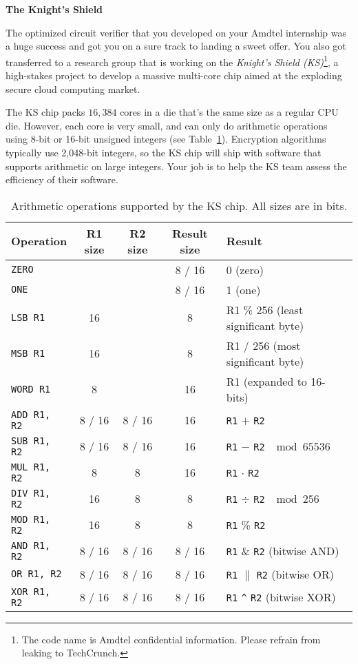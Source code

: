 \documentclass[12pt,twoside]{article}
\begin{document}
\begin{problems}

\problem {} \textbf{The Knight's Shield}

The optimized circuit verifier that you developed on your Amdtel internship was
a huge success and got you on a sure track to landing a sweet offer. You also
got transferred to a research group that is working on the \textit{Knight's
Shield (KS)}\footnote{The code name is Amdtel confidential information. Please
refrain from leaking to TechCrunch.}, a high-stakes project to develop a massive
multi-core chip aimed at the exploding secure cloud computing market.

The KS chip packs $16{,}384$ cores in a die that's the same size as a regular
CPU die. However, each core is very small, and can only do arithmetic operations
using 8-bit or 16-bit unsigned integers (see Table~\ref{table:ks-opcodes}).
Encryption algorithms typically use 2,048-bit integers, so the KS chip will ship
with software that supports arithmetic on large integers. Your job is to help
the KS team assess the efficiency of their software.

\begin{table}[htbp]
\centering
\begin{tabular}{|l|c|c|c|l|}
\hline
Operation & R1 size & R2 size & Result size & Result \\
\hline
\texttt{ZERO} & & & 8 / 16 & 0 (zero) \\ 
\hline
\texttt{ONE} & & & 8 / 16 & 1 (one) \\ 
\hline
\texttt{LSB R1} & 16 & & 8 & R1 \% 256 (least significant byte) \\ 
\hline
\texttt{MSB R1} & 16 & & 8 & R1 / 256 (most significant byte) \\ 
\hline
\texttt{WORD R1} & 8 & & 16 & R1 (expanded to 16-bits) \\ 
\hline
\texttt{ADD R1, R2} & 8 / 16 & 8 / 16 & 16 & \texttt{R1} $+$ \texttt{R2} \\ 
\hline
\texttt{SUB R1, R2} & 8 / 16 & 8 / 16 & 16 & \texttt{R1} $-$ \texttt{R2} $\mod
65536$\\
\hline
\texttt{MUL R1, R2} & 8 & 8 & 16 & \texttt{R1} $\cdot$ \texttt{R2} \\ 
\hline
\texttt{DIV R1, R2} & 16 & 8 & 8 & \texttt{R1} $\div$ \texttt{R2} $\mod 256$\\ 
\hline
\texttt{MOD R1, R2} & 16 & 8 & 8 & \texttt{R1} \% \texttt{R2} \\ 
\hline
\texttt{AND R1, R2} & 8 / 16 & 8 / 16 & 8 / 16 & \texttt{R1} \& \texttt{R2}
(bitwise AND) \\
\hline
\texttt{OR R1, R2} & 8 / 16 & 8 / 16 & 8 / 16 & \texttt{R1} $\|$ \texttt{R2}
(bitwise OR) \\
\hline
\texttt{XOR R1, R2} & 8 / 16 & 8 / 16 & 8 / 16 & \texttt{R1} \verb|^|
\texttt{R2} (bitwise XOR) \\
\hline
\end{tabular}
\caption{Arithmetic operations supported by the KS chip. All sizes are in bits.}
\label{table:ks-opcodes}
\end{table}


\end{problems}
\end{document}

